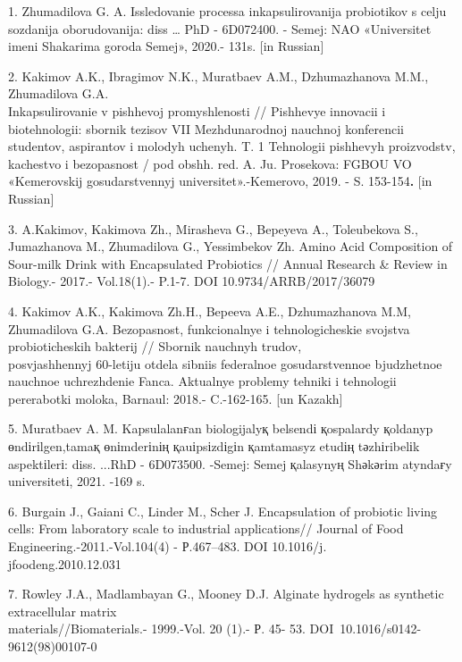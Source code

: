 \begin{noparindent}

1. Zhumadilova G. A. Issledovanie processa inkapsulirovanija probiotikov
s cel\textquotesingle ju sozdanija oborudovanija: diss \ldots{} PhD -
6D072400. - Semej: NAO «Universitet imeni Shakarima goroda Semej»,
2020.- 131s. {[}in Russian{]}

2. Kakimov A.K., Ibragimov N.K., Muratbaev A.M., Dzhumazhanova M.M.,
Zhumadilova G.A. \\Inkapsulirovanie v pishhevoj promyshlenosti //
Pishhevye innovacii i biotehnologii: sbornik tezisov VII Mezhdunarodnoj
nauchnoj konferencii studentov, aspirantov i molodyh uchenyh. T. 1
Tehnologii pishhevyh proizvodstv, kachestvo i
bezopasnost\textquotesingle{} / pod obshh. red. A. Ju. Prosekova: FGBOU
VO «Kemerovskij gosudarstvennyj universitet».-Kemerovo, 2019. - S.
153-154{\bfseries .} {[}in Russian{]}

3. A.Kakimov, Kakimova Zh., Mirasheva G., Bepeyeva A., Toleubekova S.,
Jumazhanova M., Zhumadilova G., Yessimbekov Zh. Amino Acid Composition
of Sour-milk Drink with Encapsulated Probiotics // Annual Research \&
Review in Biology.- 2017.- Vol.18(1).- P.1-7. DOI 10.9734/ARRB/2017/36079

4. Kakimov A.K., Kakimova Zh.H., Bepeeva A.E., Dzhumazhanova M.M,
Zhumadilova G.A. Bezopasnost\textquotesingle,
funkcional\textquotesingle nye i tehnologicheskie svojstva
probioticheskih bakterij // Sbornik nauchnyh trudov,\\ posvjashhennyj
60-letiju otdela sibniis federal\textquotesingle noe gosudarstvennoe
bjudzhetnoe nauchnoe uchrezhdenie Fanca. Aktual\textquotesingle nye
problemy tehniki i tehnologii pererabotki moloka, Barnaul: 2018.-
C.-162-165. {[}un Kazakh{]}

5. Muratbaev A. M. Kapsulalanғan biologijalyқ belsendі қospalardy
қoldanyp өndіrіlgen,tamaқ өnіmderіnің қauіpsіzdіgіn қamtamasyz etudің
tәzhіribelіk aspektіlerі: diss. ...RhD - 6D073500. -Semej: Semej
қalasynyң Shәkәrіm atyndaғy universitetі, 2021. -169 s.

6. Burgain J., Gaiani C., Linder M., Scher J. Encapsulation of probiotic
living cells: From laboratory scale to industrial applications// Journal
of Food Engineering.-2011.-Vol.104(4) - Р.467--483. DOI
10.1016/j.\\jfoodeng.2010.12.031

7. Rowley J.A., Madlambayan G., Mooney D.J. Alginate hydrogels as
synthetic extracellular matrix \\materials//Biomaterials.- 1999.-Vol. 20
(1).- Р. 45- 53. DOI~10.1016/s0142-9612(98)00107-0


\end{noparindent}
